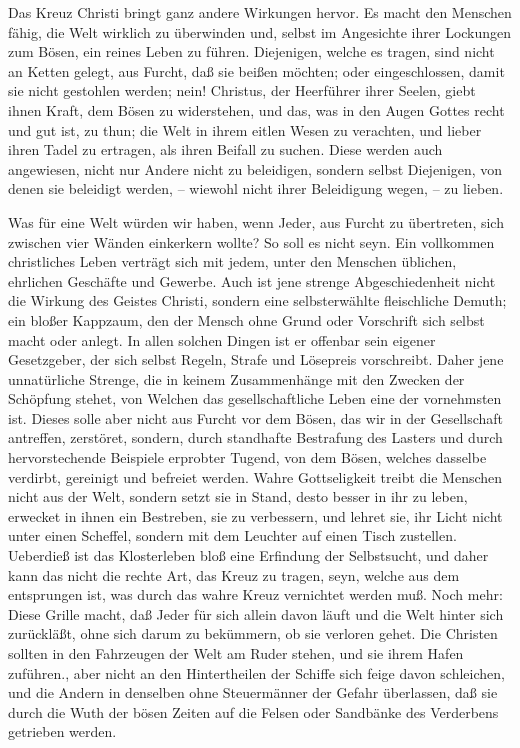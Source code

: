 Das Kreuz Christi bringt ganz andere Wirkungen hervor. Es macht den Menschen fähig, die Welt wirklich zu überwinden und, selbst im Angesichte ihrer Lockungen zum Bösen, ein reines Leben zu führen. Diejenigen, welche es tragen, sind nicht an Ketten gelegt, aus Furcht, daß sie beißen möchten; oder eingeschlossen, damit sie nicht gestohlen werden; nein! Christus, der Heerführer ihrer Seelen, giebt ihnen Kraft, dem Bösen zu widerstehen, und das, was in den Augen Gottes recht und gut ist, zu thun; die Welt in ihrem eitlen Wesen zu verachten, und lieber ihren Tadel zu ertragen, als ihren Beifall zu suchen. Diese werden auch angewiesen, nicht nur Andere nicht zu beleidigen, sondern selbst Diejenigen, von denen sie beleidigt werden, – wiewohl nicht ihrer Beleidigung wegen, – zu lieben.

Was für eine Welt würden wir haben, wenn Jeder, aus Furcht zu übertreten, sich zwischen vier Wänden einkerkern wollte? So soll es nicht seyn. Ein vollkommen  christliches Leben verträgt sich mit jedem, unter den Menschen üblichen, ehrlichen Geschäfte und Gewerbe. Auch ist jene strenge Abgeschiedenheit nicht die Wirkung des Geistes Christi, sondern eine selbsterwählte fleischliche Demuth; ein bloßer Kappzaum, den der Mensch ohne Grund oder Vorschrift sich selbst macht oder anlegt. In allen solchen Dingen ist er offenbar sein eigener Gesetzgeber, der sich selbst Regeln, Strafe und Lösepreis vorschreibt. Daher jene unnatürliche Strenge, die in keinem Zusammenhänge mit den Zwecken der Schöpfung stehet, von Welchen das gesellschaftliche Leben eine der vornehmsten ist. Dieses solle aber nicht aus Furcht vor dem Bösen, das wir in der Gesellschaft antreffen, zerstöret, sondern, durch standhafte Bestrafung des Lasters und durch hervorstechende Beispiele erprobter Tugend, von dem Bösen, welches dasselbe verdirbt, gereinigt und befreiet werden. Wahre Gottseligkeit treibt die Menschen nicht aus der Welt, sondern setzt sie in Stand, desto besser in ihr zu leben, erwecket in ihnen ein Bestreben, sie zu verbessern, und lehret sie, ihr Licht nicht unter einen Scheffel, sondern mit dem Leuchter auf einen Tisch zustellen. Ueberdieß ist das Klosterleben bloß eine Erfindung der Selbstsucht, und daher kann das nicht die rechte Art, das Kreuz zu tragen, seyn, welche aus dem entsprungen ist, was durch das wahre Kreuz vernichtet werden muß. Noch mehr: Diese Grille macht, daß Jeder für sich allein davon läuft und die Welt hinter sich zurückläßt, ohne sich darum zu bekümmern, ob sie verloren gehet. Die Christen sollten in den Fahrzeugen der Welt am Ruder stehen, und sie ihrem Hafen zuführen., aber nicht an den Hintertheilen der Schiffe sich feige davon schleichen, und die Andern in denselben ohne Steuermänner der Gefahr überlassen, daß sie durch die Wuth der bösen Zeiten auf die Felsen oder Sandbänke des Verderbens getrieben werden.

